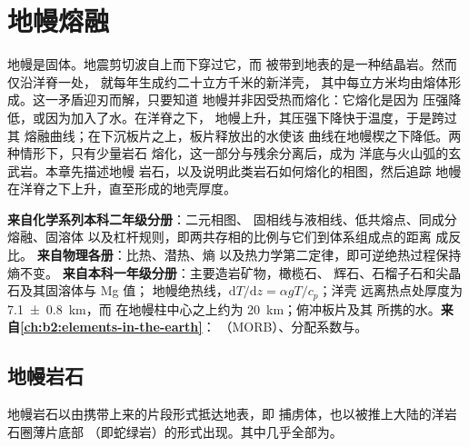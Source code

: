 \chapter{地幔熔融}\label{ch:b2:mantle-melting}

地幔是固体。地震剪切波自上而下穿过它，而
被带到地表的是一种结晶岩。然而仅沿洋脊一处，
就每年生成约二十立方千米的新洋壳，
其中每立方米均由熔体形成。这一矛盾迎刃而解，只要知道
地幔并非因受热而熔化：它熔化是因为
压强降低，或因为加入了水。在洋脊之下，
地幔上升，其压强下降快于温度，于是跨过其
熔融曲线；在下沉板片之上，板片释放出的水使该
曲线在地幔楔之下降低。两种情形下，只有少量岩石
熔化，这一部分与残余分离后，成为
洋底与火山弧的玄武岩。本章先描述地幔
岩石，以及说明此类岩石如何熔化的相图，然后追踪
地幔在洋脊之下上升，直至形成的地壳厚度。

\begin{recall}
\textbf{来自化学系列本科二年级分册}：二元相图、
固相线与液相线、低共熔点、同成分熔融、固溶体
以及杠杆规则，即两共存相的比例与它们到体系组成点的距离
成反比。
\textbf{来自物理各册}：比热、潜热、熵
以及热力学第二定律，即可逆绝热过程保持熵不变。
\textbf{来自本科一年级分册}：主要造岩矿物，橄榄石、
辉石、石榴子石和尖晶石及其固溶体与 Mg 值；
地幔绝热线，$\mathrm dT/\mathrm dz = \alpha gT/c_p$；洋壳
远离热点处厚度为 \qty[uncertainty-mode=separate]{7.1 \pm 0.8}{km}，而
在地幔柱中心之上约为 \qty{20}{km}；俯冲板片及其
所携的水。\textbf{来自\cref{ch:b2:elements-in-the-earth}}：
（MORB）、分配系数与。
\end{recall}

\section{地幔岩石}\label{sec:b2:mantle-melting:rock}

地幔岩石以由携带上来的片段形式抵达地表，即
捕虏体，也以被推上大陆的洋岩石圈薄片底部
（即蛇绿岩）的形式出现。其中几乎全部为。

